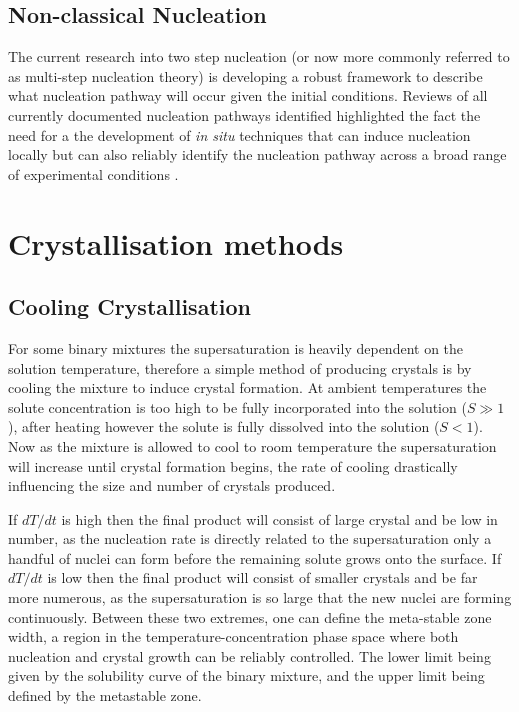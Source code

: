 \subsection{Non-classical Nucleation} 
The current research into two step nucleation (or now more commonly 
referred to as multi-step nucleation theory) is developing a robust 
framework to describe what nucleation pathway will occur given the 
initial conditions. Reviews of all currently documented nucleation 
pathways identified highlighted the fact the need for a the 
development of \textit{in situ} techniques that can induce nucleation 
locally but can also reliably identify the nucleation pathway across 
a broad range of experimental conditions \cite{Karthika2016, Fu2021}. 


\section{Crystallisation methods}
\subsection{Cooling Crystallisation}
For some binary mixtures the supersaturation is heavily dependent on 
the solution temperature, therefore a simple method of producing crystals 
is by cooling the mixture to induce crystal formation. At ambient 
temperatures the solute concentration is too high to be fully incorporated
into the solution ($S\gg 1$), after heating however the solute is fully 
dissolved into the solution ($S<1$). Now as the mixture is allowed to cool 
to room temperature the supersaturation will increase until crystal formation begins, the rate of cooling drastically influencing the size and number of crystals produced.

If $dT/dt$ is high then the final product will consist of large 
crystal and be low in number, as the nucleation rate is directly related
to the supersaturation only a handful of nuclei can form before the remaining
solute grows onto the surface. If $dT/dt$ is low then the final product will 
consist of smaller crystals and be far more numerous, as the supersaturation 
is so large that the new nuclei are forming continuously. Between these two 
extremes, one can define the meta-stable zone width, a region in the 
temperature-concentration phase space where both nucleation and crystal growth
can be reliably controlled. The lower limit being given by the solubility curve
of the binary mixture, and the upper limit being defined by the metastable zone.


